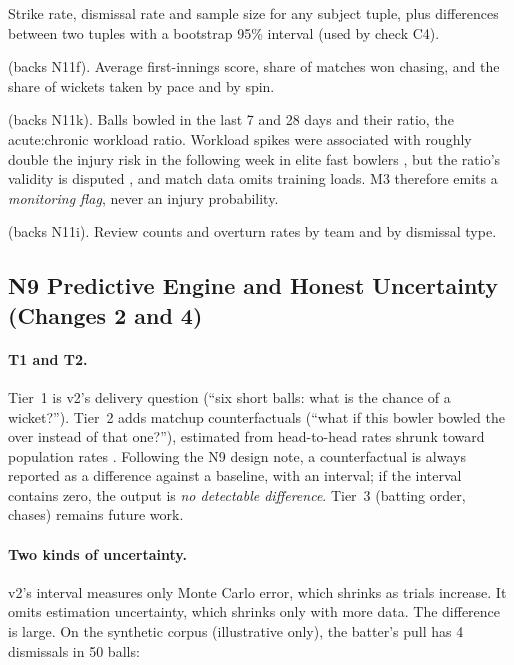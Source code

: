 \documentclass[11pt,a4paper]{article}
\begin{document}
\begin{description}[leftmargin=1.2em,style=nextline,itemsep=2pt]
\item[M1 --- delivery statistics.] Strike rate, dismissal rate and sample size
  for any subject tuple, plus differences between two tuples with a bootstrap
  95\% interval (used by check C4).
\item[M2 --- venue profile] (backs N11f). Average first-innings score, share of
  matches won chasing, and the share of wickets taken by pace and by spin.
\item[M3 --- bowling workload] (backs N11k). Balls bowled in the last 7 and 28
  days and their ratio, the acute:chronic workload ratio. Workload spikes were
  associated with roughly double the injury risk in the following week in elite
  fast bowlers \cite{hulin}, but the ratio's validity is disputed
  \cite{impellizzeri}, and match data omits training loads. M3 therefore emits a
  \emph{monitoring flag}, never an injury probability.
\item[M4 --- DRS reviews] (backs N11i). Review counts and overturn rates by team
  and by dismissal type.
\end{description}

\subsection{N9 Predictive Engine and Honest Uncertainty (Changes 2 and 4)}
\label{sec:uncert}

\paragraph{T1 and T2.} Tier~1 is v2's delivery question (``six short balls: what
is the chance of a wicket?''). Tier~2 adds matchup counterfactuals (``what if
this bowler bowled the over instead of that one?''), estimated from head-to-head
rates shrunk toward population rates \cite{efron}. Following the N9 design note,
a counterfactual is always reported as a difference against a baseline, with an
interval; if the interval contains zero, the output is \emph{no detectable
difference}. Tier~3 (batting order, chases) remains future work.

\paragraph{Two kinds of uncertainty.} v2's interval measures only Monte Carlo
error, which shrinks as trials increase. It omits estimation uncertainty, which
shrinks only with more data. The difference is large. On the synthetic corpus
(illustrative only), the batter's pull has 4 dismissals in 50 balls:
\end{document}
